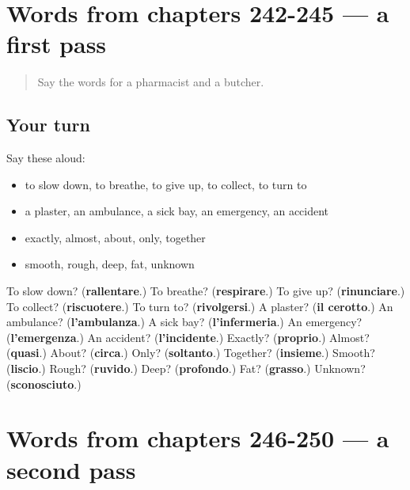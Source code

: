 \section[(dialogue)]{Words from chapters 242-245 — a first pass}

\label{lesson:IT-R250-first-pass-words-from-chapters-242-245}



\begin{quote}
Say the words for a pharmacist and a butcher.
\end{quote}

\subsection*{Your turn}
Say these aloud:

\begin{itemize}
\raggedright
  \item to slow down, to breathe, to give up, to collect, to turn to
  \item a plaster, an ambulance, a sick bay, an emergency, an accident
  \item exactly, almost, about, only, together
  \item smooth, rough, deep, fat, unknown
\end{itemize}

\begin{tcolorbox}[breakable,colback=teal!4,colframe=teal!35!black,title={Before you move on}]
To slow down? (\textbf{rallentare}.) To breathe? (\textbf{respirare}.) To give up? (\textbf{rinunciare}.) To collect? (\textbf{riscuotere}.) To turn to? (\textbf{rivolgersi}.) A plaster? (\textbf{il cerotto}.) An ambulance? (\textbf{l'ambulanza}.) A sick bay? (\textbf{l'infermeria}.) An emergency? (\textbf{l'emergenza}.) An accident? (\textbf{l'incidente}.) Exactly? (\textbf{proprio}.) Almost? (\textbf{quasi}.) About? (\textbf{circa}.) Only? (\textbf{soltanto}.) Together? (\textbf{insieme}.) Smooth? (\textbf{liscio}.) Rough? (\textbf{ruvido}.) Deep? (\textbf{profondo}.) Fat? (\textbf{grasso}.) Unknown? (\textbf{sconosciuto}.)
\end{tcolorbox}
\section[(dialogue)]{Words from chapters 246-250 — a second pass}

\label{lesson:IT-R250-second-pass-words-from-chapters-246-250}



